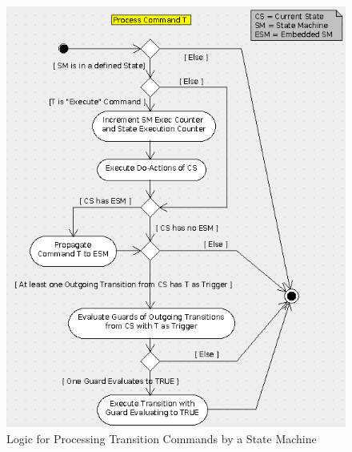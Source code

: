 \documentclass[a4paper,10pt]{article}
\begin{document}
\begin{figure}
 \centering
 \includegraphics[scale=0.55,keepaspectratio=true]{../images/SM_CmdProcessing.png}
 \caption{Logic for Processing Transition Commands by a State Machine}
 \label{fig:SmTransCmd}
\end{figure}
\end{document}
